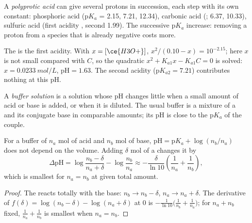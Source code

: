 \begin{definition}\label{def:b1:predominant-reaction:polyprotic}
A \emph{polyprotic acid} can give several protons
in succession, each step with its own constant: phosphoric acid
 ($\mathrm{p}K_a$ = 2.15, 7.21, 12.34), carbonic acid
(; 6.37, 10.33), sulfuric acid (first acidity , second
1.99). The successive $\mathrm{p}K_a$ increase: removing a proton from a
species that is already negative costs more.
\end{definition}

\begin{example}\label{ex:b1:predominant-reaction:h3po4}
The  is the first acidity. With $x = [\ce{H3O+}]$,
$x^2/(0.10 - x) = 10^{-2.15}$; here $x$ is not small compared with $C$, so
the quadratic $x^2 + K_{a1}x - K_{a1}C = 0$ is solved: $x =
\qty{0.0233}{mol/L}$, $\mathrm{pH} = 1.63$. The second acidity
($\mathrm{p}K_{a2} = 7.21$) contributes nothing at this pH.
\end{example}

\begin{definition}\label{def:b1:predominant-reaction:buffer}
A \emph{buffer solution} is a solution whose pH
changes little when a small amount of acid or base is added, or when it
is diluted. The usual buffer is a mixture of a  and its conjugate
base in comparable amounts; its pH is close to the $\mathrm{p}K_a$ of the
couple.
\end{definition}

\begin{proposition}\label{prop:b1:predominant-reaction:buffer}
For a buffer of $n_a$ mol of acid and $n_b$ mol of base, $\mathrm{pH} =
\mathrm{p}K_a + \log(n_b/n_a)$ does not depend on the volume. Adding
$\delta$ mol of a  changes it by
\[
  \Delta\mathrm{pH} = \log\frac{n_b - \delta}{n_a + \delta} - \log\frac{n_b}{n_a}
  \approx -\frac{\delta}{\ln 10}\left(\frac{1}{n_a} + \frac{1}{n_b}\right),
\]
which is smallest for $n_a = n_b$ at given total amount.
\end{proposition}

\begin{proof}
The  reacts totally with the base: $n_b \to n_b - \delta$,
$n_a \to n_a + \delta$. The derivative of $f(\delta) = \log(n_b - \delta) -
\log(n_a + \delta)$ at 0 is $-\frac{1}{\ln10}\big(\frac{1}{n_b} +
\frac{1}{n_a}\big)$; for $n_a + n_b$ fixed, $\frac1{n_a} + \frac1{n_b}$ is
smallest when $n_a = n_b$.
\end{proof}

